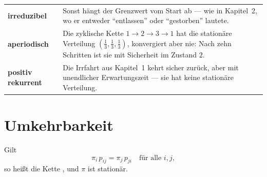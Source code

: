 \begin{warnung}
\begin{center}
{\small
\renewcommand{\arraystretch}{1.52}
\begin{tabular}{@{}P{2.4cm}P{6.2cm}@{}}
\toprule
\textbf{irreduzibel} & Sonst hängt der Grenzwert vom Start ab --- wie in Kapitel~2, wo er entweder \enquote{entlassen} oder \enquote{gestorben} lautete.\\
\textbf{aperiodisch} & Die zyklische Kette $1\to2\to3\to1$ hat die stationäre Verteilung $(\tfrac13,\tfrac13,\tfrac13)$, konvergiert aber nie: Nach zehn Schritten ist sie mit Sicherheit im Zustand $2$.\\
\textbf{positiv rekurrent} & Die Irrfahrt aus Kapitel~1 kehrt sicher zurück, aber mit unendlicher Erwartungszeit --- sie hat keine stationäre Verteilung.\\
\bottomrule
\end{tabular}}
\end{center}

\begin{center}
\begin{minipage}{0.88\textwidth}
\end{minipage}
\end{center}
\end{warnung}

\section{Umkehrbarkeit}

\begin{definition}
Gilt
\[ \pi_i\,p_{ij} = \pi_j\,p_{ji} \quad\text{für alle } i,j , \]
so heißt die Kette , und $\pi$ ist stationär.
\end{definition}

